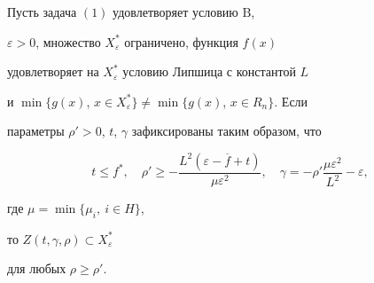 \begin{thm}


Пусть задача $(1)$ удовлетворяет условию $\mathrm B$,


$\varepsilon>0$, множество $X_{\varepsilon}^*$ ограничено, функция $f(x)$ 


удовлетворяет на $X_{\varepsilon}^*$ условию Липшица с константой $L$ 


и $\min\{g(x)$, $x\in X_{\varepsilon}^*\}\ne\min\{g(x)$, $x\in R_n\}$. Если


параметры $\rho'>0$, $t$, $\gamma$ зафиксированы таким образом, что 


\begin{equation} 


t\le f^*, \quad


\rho'\ge-\frac{L^2(\varepsilon-\overline{f}+t)}{\mu\varepsilon^2}, \quad


\gamma=-\rho'\frac{\mu\varepsilon^2}{L^2}-\varepsilon,


\end{equation}


где $\mu=\min\{\mu_i,\ i\in H\}$,


то $Z(t,\gamma,\rho)\subset X_{\varepsilon}^*$


для любых $\rho\ge\rho'$.


\end{thm}





